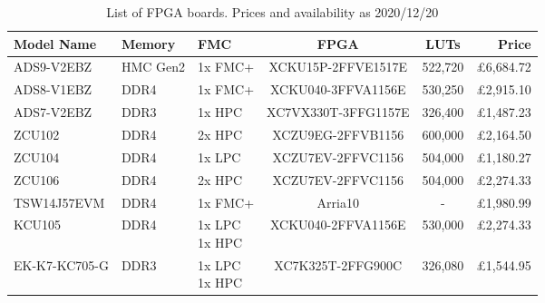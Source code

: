 \begin{table}[h]
    \begin{tabularx}{1\textwidth}{l|l|l|c|c|r}
        \textbf{Model Name} & \textbf{Memory} & \textbf{FMC} & \textbf{FPGA}& \textbf{LUTs} & \textbf{Price} \\ \hline
        ADS9-V2EBZ &	HMC Gen2 &	1x FMC+ & \parbox[t]{3cm}{XCKU15P-2FFVE1517E} & 522,720 & £6,684.72 \\
        ADS8-V1EBZ &	DDR4 &	1x FMC+ & \parbox[t]{3cm}{XCKU040-3FFVA1156E} & 530,250 & £2,915.10 \\
        ADS7-V2EBZ &	DDR3 &	1x HPC & \parbox[t]{3cm}{XC7VX330T-3FFG1157E}  & 326,400 & £1,487.23 \\
        ZCU102 &	DDR4 &	2x HPC & \parbox[t]{3cm}{XCZU9EG-2FFVB1156}  & 600,000 & £2,164.50 \\
        ZCU104 &	DDR4 &	1x LPC & \parbox[t]{3cm}{XCZU7EV-2FFVC1156} & 504,000 & £1,180.27 \\
        ZCU106 &	DDR4 &	2x HPC & \parbox[t]{3cm}{XCZU7EV-2FFVC1156} & 504,000 & £2,274.33 \\
        TSW14J57EVM & DDR4 & 1x FMC+ & Arria10 & - & £1,980.99 \\
        KCU105 &	DDR4 &	\parbox[t]{1.8cm}{1x LPC \\ 1x HPC}  & \parbox[t]{3cm}{XCKU040-2FFVA1156E} & 530,000 & £2,274.33 \\
        EK-K7-KC705-G & DDR3 &  \parbox[t]{1.8cm}{1x LPC \\ 1x HPC} & \parbox[t]{3cm}{XC7K325T-2FFG900C} & 326,080 & £1,544.95 \\
        

    \end{tabularx}
	\caption{List of FPGA boards. Prices and availability as 2020/12/20}
	\label{table:fpga_list}
\end{table}